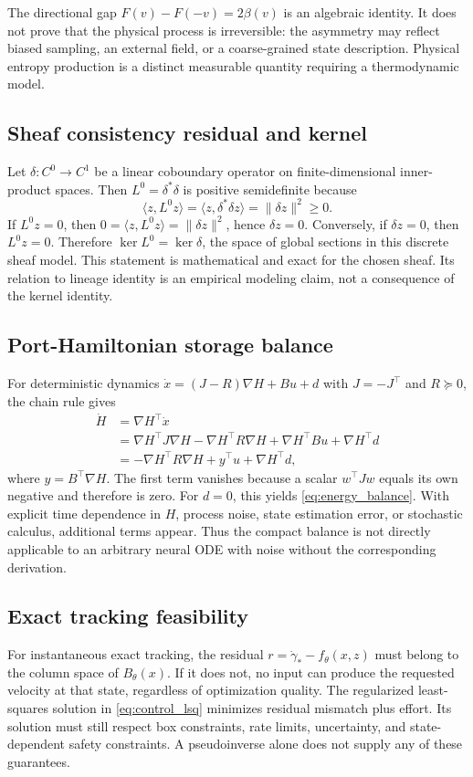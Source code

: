 \documentclass[11pt,a4paper]{article}
\theoremstyle{definition}
\theoremstyle{remark}
\begin{document}
The directional gap $F(v)-F(-v)=2\beta(v)$ is an algebraic identity. It does not prove that the physical process is irreversible: the asymmetry may reflect biased sampling, an external field, or a coarse-grained state description. Physical entropy production is a distinct measurable quantity requiring a thermodynamic model.

\subsection{Sheaf consistency residual and kernel}
Let $\delta:C^0\rightarrow C^1$ be a linear coboundary operator on finite-dimensional inner-product spaces. Then $L^0=\delta^*\delta$ is positive semidefinite because
\begin{equation}
\langle z,L^0z\rangle=\langle z,\delta^*\delta z\rangle=\|\delta z\|^2\geq0.
\end{equation}
If $L^0z=0$, then $0=\langle z,L^0z\rangle=\|\delta z\|^2$, hence $\delta z=0$. Conversely, if $\delta z=0$, then $L^0z=0$. Therefore $\ker L^0=\ker\delta$, the space of global sections in this discrete sheaf model. This statement is mathematical and exact for the chosen sheaf. Its relation to lineage identity is an empirical modeling claim, not a consequence of the kernel identity.

\subsection{Port-Hamiltonian storage balance}
For deterministic dynamics $\dot x=(J-R)\nabla H+Bu+d$ with $J=-J^\top$ and $R\succeq0$, the chain rule gives
\begin{align}
\dot H &= \nabla H^\top\dot x\\
&=\nabla H^\top J\nabla H-\nabla H^\top R\nabla H+\nabla H^\top Bu+\nabla H^\top d\\
&=-\nabla H^\top R\nabla H+y^\top u+\nabla H^\top d,
\end{align}
where $y=B^\top\nabla H$. The first term vanishes because a scalar $w^\top Jw$ equals its own negative and therefore is zero. For $d=0$, this yields \cref{eq:energy_balance}. With explicit time dependence in $H$, process noise, state estimation error, or stochastic calculus, additional terms appear. Thus the compact balance is not directly applicable to an arbitrary neural ODE with noise without the corresponding derivation.

\subsection{Exact tracking feasibility}
For instantaneous exact tracking, the residual $r=\dot\gamma_*-f_\theta(x,z)$ must belong to the column space of $B_\theta(x)$. If it does not, no input can produce the requested velocity at that state, regardless of optimization quality. The regularized least-squares solution in \cref{eq:control_lsq} minimizes residual mismatch plus effort. Its solution must still respect box constraints, rate limits, uncertainty, and state-dependent safety constraints. A pseudoinverse alone does not supply any of these guarantees.
\end{document}
